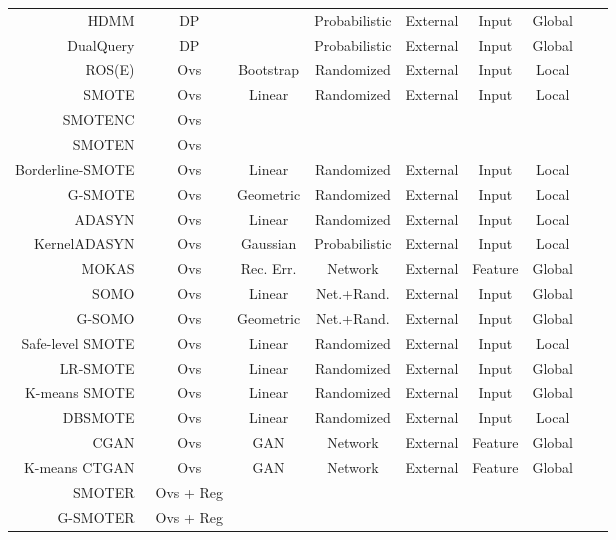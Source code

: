 \documentclass[parskip=full]{scrartcl}
\begin{document}
\begin{longtable}{rcccccccc}
    HDMM~\cite{mckenna2018optimizing} & DP &  & Probabilistic & External & Input & Global \\
    DualQuery~\cite{gaboardi2014dual} & DP &  & Probabilistic & External & Input & Global \\
    ROS(E)~\cite{menardi2014training} & Ovs & Bootstrap & Randomized & External & Input & Local \\ 
    SMOTE~\cite{chawla2002smote} & Ovs & Linear & Randomized & External & Input & Local \\
    SMOTENC~\cite{chawla2002smote} & Ovs \\
    SMOTEN~\cite{chawla2002smote} & Ovs \\
    Borderline-SMOTE~\cite{han2005borderline} & Ovs & Linear & Randomized & External & Input & Local \\
    G-SMOTE~\cite{douzas2019geometric} & Ovs & Geometric & Randomized & External & Input & Local \\
    ADASYN~\cite{he2008adasyn} & Ovs & Linear & Randomized & External & Input & Local \\
    KernelADASYN~\cite{tang2015kerneladasyn} & Ovs & Gaussian & Probabilistic & External & Input & Local \\
    MOKAS~\cite{lin2017minority} & Ovs & Rec. Err. & Network & External & Feature & Global \\
    SOMO~\cite{douzas2017self} & Ovs & Linear & Net.+Rand. & External & Input & Global \\
    G-SOMO~\cite{douzas2021g} & Ovs & Geometric & Net.+Rand. & External & Input & Global \\
    Safe-level SMOTE~\cite{bunkhumpornpat2009safe} & Ovs & Linear & Randomized & External & Input & Local \\
    LR-SMOTE~\cite{liang2020lr} & Ovs & Linear & Randomized & External & Input & Global \\
    K-means SMOTE~\cite{douzas2018improving} & Ovs & Linear & Randomized & External & Input & Global\\
    DBSMOTE~\cite{bunkhumpornpat2012dbsmote} & Ovs & Linear & Randomized & External & Input & Local\\
    CGAN~\cite{douzas2018effective} & Ovs & GAN & Network & External & Feature & Global \\
    K-means CTGAN~\cite{an2021k} & Ovs & GAN & Network & External & Feature & Global \\
    SMOTER~\cite{torgo2013smote} & Ovs + Reg \\
    G-SMOTER~\cite{camacho2022geometric} & Ovs + Reg \\

\end{longtable}
\end{document}
